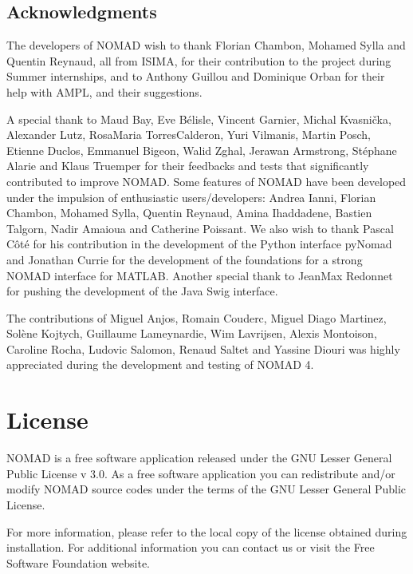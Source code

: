 \documentclass[letterpaper,10pt,english]{sphinxmanual}
\begin{document}
\section{Acknowledgments}
\label{\detokenize{Introduction:acknowledgments}}
\sphinxAtStartPar
The developers of NOMAD wish to thank Florian Chambon, Mohamed Sylla and Quentin Reynaud, all from ISIMA, for their contribution
to the project during Summer internships, and to Anthony Guillou and Dominique Orban for their help with AMPL, and their suggestions.

\sphinxAtStartPar
A special thank to Maud Bay, Eve Bélisle, Vincent Garnier, Michal Kvasnička, Alexander Lutz, Rosa\sphinxhyphen{}Maria Torres\sphinxhyphen{}Calderon, Yuri Vilmanis, Martin Posch, Etienne Duclos, Emmanuel Bigeon, Walid Zghal, Jerawan Armstrong, Stéphane Alarie and Klaus Truemper for their feedbacks and tests that significantly contributed to improve NOMAD. Some features of NOMAD have been developed under the impulsion of enthusiastic users/developers: Andrea Ianni, Florian Chambon, Mohamed Sylla, Quentin Reynaud, Amina Ihaddadene, Bastien Talgorn, Nadir Amaioua and Catherine Poissant.
We also wish to thank Pascal Côté for his contribution in the development of the Python interface pyNomad and Jonathan Currie for the development of the foundations for a strong NOMAD interface for MATLAB.
Another special thank to Jean\sphinxhyphen{}Max Redonnet for pushing the development of the Java Swig interface.

\sphinxAtStartPar
The contributions of  Miguel Anjos, Romain Couderc, Miguel Diago Martinez, Solène Kojtych, Guillaume Lameynardie, Wim Lavrijsen, Alexis Montoison, Caroline Rocha, Ludovic Salomon, Renaud Saltet and Yassine Diouri was highly appreciated during the development and testing of NOMAD 4.


\chapter{License}
\label{\detokenize{Introduction:license}}
\sphinxAtStartPar
NOMAD is a free software application released under the GNU Lesser General Public License v 3.0.
As a free software application you can redistribute and/or modify NOMAD source codes under the terms of the GNU Lesser General Public License.

\sphinxAtStartPar
For more information, please refer to the local copy of the license obtained during installation.
For additional information you can contact us or visit the Free Software Foundation website.
\end{document}
